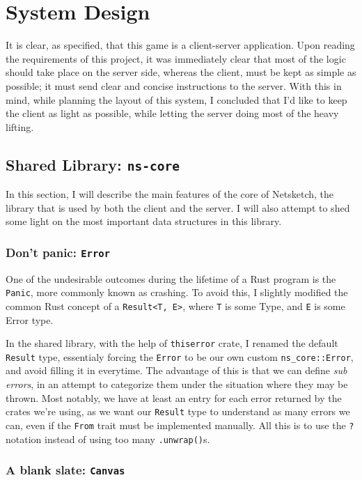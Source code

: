 \documentclass{article}
\newcommand{\code}[1]{\texttt{#1}}
\begin{document}

\section{System Design}
It is clear, as specified, that this game is a client-server application. Upon
reading the requirements of this project, it was immediately clear that most of
the logic should take place on the server side, whereas the client, must be kept
as simple as possible; it must send clear and concise instructions to the server.
With this in mind, while planning the layout of this system, I concluded that
I'd like to keep the client as light as possible, while letting the server doing
most of the heavy lifting.

\subsection{Shared Library: \code{ns-core}}
In this section, I will describe the main features of the core of Netsketch, the library that is used by both the client and the server. I will also attempt to shed some light on the most important data structures in this library.

\subsubsection{Don't panic: \code{Error}}

One of the undesirable outcomes during the lifetime of a Rust program is the
\code{Panic}, more commonly known as crashing. To avoid this, I slightly
modified the common Rust concept of a \code{Result<T, E>}, where \code{T} is some Type, and \code{E} is some Error type.

In the shared library, with the help of \code{thiserror} crate, I renamed the default \code{Result} type, essentialy forcing the \code{Error} to be our own custom \code{ns\_core::Error}, and avoid filling it in everytime. The advantage of this is that we can define \textit{sub errors}, in an attempt to categorize them under the situation where they may be thrown. Most notably, we have at least an entry for each error returned by the crates we're using, as we want our \code{Result} type to understand as many errors we can, even if the \code{From} trait must be implemented manually. All this is to use the \code{?} notation instead of using too many \code{.unwrap()}s.


\subsubsection{A blank slate: \code{Canvas}}
\end{document}
